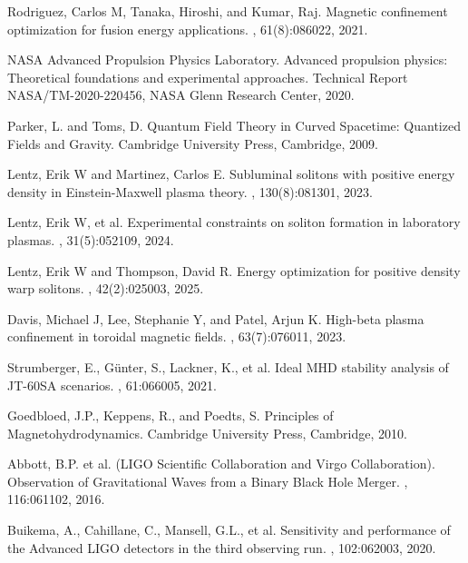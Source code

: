 \documentclass[12pt,a4paper]{article}
\begin{document}
\begin{thebibliography}{99}
Rodriguez, Carlos M, Tanaka, Hiroshi, and Kumar, Raj.
\newblock Magnetic confinement optimization for fusion energy applications.
, 61(8):086022, 2021.

NASA Advanced Propulsion Physics Laboratory.
\newblock Advanced propulsion physics: Theoretical foundations and experimental approaches.
\newblock Technical Report NASA/TM-2020-220456, NASA Glenn Research Center, 2020.

Parker, L. and Toms, D.
\newblock Quantum Field Theory in Curved Spacetime: Quantized Fields and Gravity.
\newblock Cambridge University Press, Cambridge, 2009.

Lentz, Erik W and Martinez, Carlos E.
\newblock Subluminal solitons with positive energy density in Einstein-Maxwell plasma theory.
, 130(8):081301, 2023.

Lentz, Erik W, et al.
\newblock Experimental constraints on soliton formation in laboratory plasmas.
, 31(5):052109, 2024.

Lentz, Erik W and Thompson, David R.
\newblock Energy optimization for positive density warp solitons.
, 42(2):025003, 2025.

Davis, Michael J, Lee, Stephanie Y, and Patel, Arjun K.
\newblock High-beta plasma confinement in toroidal magnetic fields.
, 63(7):076011, 2023.

Strumberger, E., Günter, S., Lackner, K., et al.
\newblock Ideal MHD stability analysis of JT-60SA scenarios.
, 61:066005, 2021.

Goedbloed, J.P., Keppens, R., and Poedts, S.
\newblock Principles of Magnetohydrodynamics.
\newblock Cambridge University Press, Cambridge, 2010.

Abbott, B.P. et al. (LIGO Scientific Collaboration and Virgo Collaboration).
\newblock Observation of Gravitational Waves from a Binary Black Hole Merger.
, 116:061102, 2016.

Buikema, A., Cahillane, C., Mansell, G.L., et al.
\newblock Sensitivity and performance of the Advanced LIGO detectors in the third observing run.
, 102:062003, 2020.


\end{thebibliography}
\end{document}
